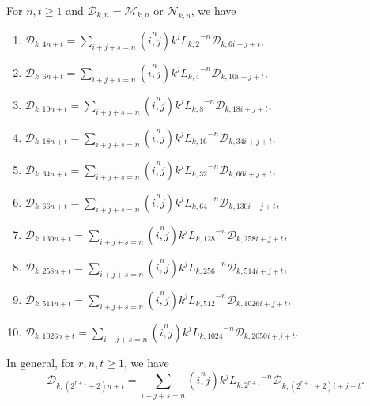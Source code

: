 \begin{theorem}For $n, t\geq 1$ and $\mathcal{D}_{k,n}=\mathcal{M}_{k,n}$ or $\mathcal{N}_{k,n}$, we have\label{3.8}
\begin{enumerate}
\item $\mathcal{D}_{k,4n+t}=\sum\limits_{i+j+s=n}\left( \stackrel{n}{i,j}\right) k^{j}{L_{k,2}}^{-n}\mathcal{D}_{k,6i+j+t} $,
\item $\mathcal{D}_{k,6n+t}=\sum\limits_{i+j+s=n}\left( \stackrel{n}{i,j}\right) k^{j}{L_{k,4}}^{-n}\mathcal{D}_{k,10i+j+t} $,
\item $\mathcal{D}_{k,10n+t}=\sum\limits_{i+j+s=n}\left( \stackrel{n}{i,j}\right) k^{j}{L_{k,8}}^{-n}\mathcal{D}_{k,18i+j+t} $,
\item $\mathcal{D}_{k,18n+t}=\sum\limits_{i+j+s=n}\left( \stackrel{n}{i,j}\right) k^{j}{L_{k,16}}^{-n}\mathcal{D}_{k,34i+j+t} $,
\item $\mathcal{D}_{k,34n+t}=\sum\limits_{i+j+s=n}\left( \stackrel{n}{i,j}\right) k^{j}{L_{k,32}}^{-n}\mathcal{D}_{k,66i+j+t} $,
\item $\mathcal{D}_{k,66n+t}=\sum\limits_{i+j+s=n}\left( \stackrel{n}{i,j}\right) k^{j}{L_{k,64}}^{-n}\mathcal{D}_{k,130i+j+t} $,
\item $\mathcal{D}_{k,130n+t}=\sum\limits_{i+j+s=n}\left( \stackrel{n}{i,j}\right) k^{j}{L_{k,128}}^{-n}\mathcal{D}_{k,258i+j+t} $,
\item $\mathcal{D}_{k,258n+t}=\sum\limits_{i+j+s=n}\left( \stackrel{n}{i,j}\right) k^{j}{L_{k,256}}^{-n}\mathcal{D}_{k,514i+j+t} $,
\item $\mathcal{D}_{k,514n+t}=\sum\limits_{i+j+s=n}\left( \stackrel{n}{i,j}\right) k^{j}{L_{k,512}}^{-n}\mathcal{D}_{k,1026i+j+t} $,
\item $\mathcal{D}_{k,1026n+t}=\sum\limits_{i+j+s=n}\left( \stackrel{n}{i,j}\right) k^{j}{L_{k,1024}}^{-n}\mathcal{D}_{k,2050i+j+t} $.
\end{enumerate}
In general, for $r, n,t\geq 1$, we have
$$\mathcal{D}_{k,(2^{r+1}+2)n+t}=\sum\limits_{i+j+s=n}\left( \stackrel{n}{i,j}\right) k^{j}{L_{k,2^{r+1}}}^{-n}\mathcal{D}_{k,(2^{r+1}+2)i+j+t}. $$
\end{theorem}
